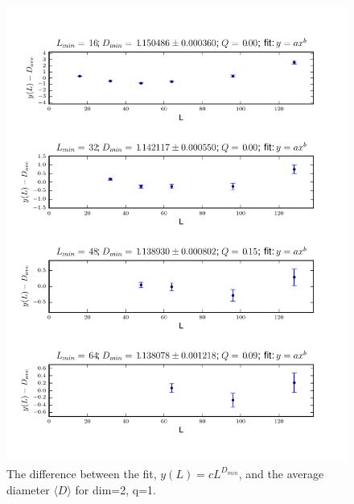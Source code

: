 \documentclass[pre,preprint]{revtex4}
\newcommand{\lb}{{\langle}}
\newcommand{\rb}{{\rangle}}
\begin{document}
\begin{figure}[htp]
\centering
\includegraphics[width=.85\textwidth]{figures/D_min_D2q1_46_fig}
\caption{The difference between the fit, $y(L)=cL^{D_{min}}$, and the average diameter $\lb D \rb$ for dim=2, q=1.}\label{fig:2}
\end{figure}


\end{document}
